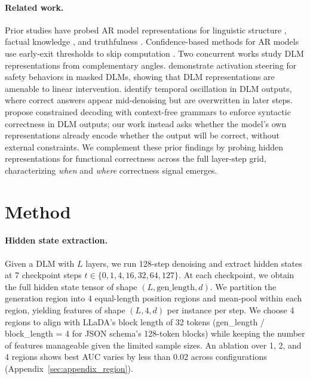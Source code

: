 \documentclass[11pt]{article}
\begin{document}
\paragraph{Related work.}
Prior studies have probed AR model representations for linguistic structure \citep{tenney2019bert}, factual knowledge \citep{geva2023dissecting}, and truthfulness \citep{azaria2023internal}.
Confidence-based methods for AR models use early-exit thresholds to skip computation \citep{schuster2022confident,elbayad2020depth}.
Two concurrent works study DLM representations from complementary angles.
\citet{shnaidman2025steering} demonstrate activation steering for safety behaviors in masked DLMs, showing that DLM representations are amenable to linear intervention.
\citet{wang2025time} identify temporal oscillation in DLM outputs, where correct answers appear mid-denoising but are overwritten in later steps.
\citet{mundler2025constrained} propose constrained decoding with context-free grammars to enforce syntactic correctness in DLM outputs; our work instead asks whether the model's own representations already encode whether the output will be correct, without external constraints.
We complement these prior findings by probing hidden representations for functional correctness across the full layer-step grid, characterizing \emph{when} and \emph{where} correctness signal emerges.

\section{Method}

\paragraph{Hidden state extraction.}
Given a DLM with $L$ layers, we run 128-step denoising and extract hidden states at 7 checkpoint steps $t \in \{0, 1, 4, 16, 32, 64, 127\}$.
At each checkpoint, we obtain the full hidden state tensor of shape $(L, \text{gen\_length}, d)$.
We partition the generation region into 4 equal-length position regions and mean-pool within each region, yielding features of shape $(L, 4, d)$ per instance per step.
We choose 4 regions to align with LLaDA's block length of 32 tokens (gen\_length / block\_length = 4 for JSON schema's 128-token blocks) while keeping the number of features manageable given the limited sample sizes.
An ablation over 1, 2, and 4 regions shows best AUC varies by less than 0.02 across configurations (Appendix~\ref{sec:appendix_region}).
\end{document}
